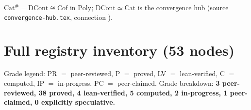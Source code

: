 \documentclass[11pt]{article}
\begin{document}
\begin{remark}
$\mathrm{Cat}^{\#}=\mathrm{DCont}\cong\mathrm{Cof}$ in $\mathrm{Poly}$; $\mathrm{DCont}\simeq
\mathrm{Cat}$ is the convergence hub (source \texttt{convergence-hub.tex}, connection
).
\end{remark}

\appendix
\section{Full registry inventory (53 nodes)}
Grade legend: PR $=$ peer-reviewed, P $=$ proved, LV $=$ lean-verified, C $=$ computed,
IP $=$ in-progress, PC $=$ peer-claimed. Grade breakdown: \textbf{3 peer-reviewed, 38 proved,
4 lean-verified, 5 computed, 2 in-progress, 1 peer-claimed, 0 explicitly speculative.}
\end{document}
